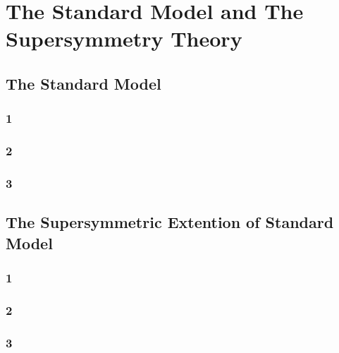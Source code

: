 \chapter{The Standard Model and The Supersymmetry Theory}

\section{The Standard Model}
\subsection{1}
\subsection{2}
\subsection{3}

\section{The Supersymmetric Extention of Standard Model}
\subsection{1}
\subsection{2}
\subsection{3}
